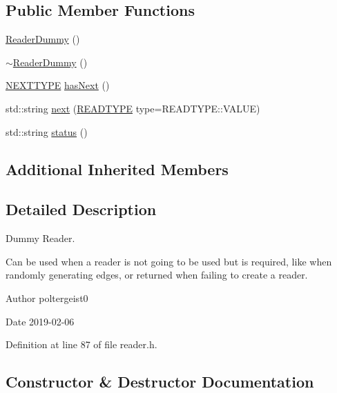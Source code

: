 \subsection*{Public Member Functions}
\begin{DoxyCompactItemize}
\item 
\hyperlink{classReaderDummy_afdafad1ede54a08c1e760b9d3b66a4ba}{Reader\+Dummy} ()
\item 
\hyperlink{classReaderDummy_aa35fb0b96855f0c195a9bd1dee074112}{$\sim$\+Reader\+Dummy} ()
\item 
\hyperlink{classReaderInterface_ac2420ec8d2f60feadf2533d4fa77ec5e}{N\+E\+X\+T\+T\+Y\+PE} \hyperlink{classReaderDummy_aac648da900b0602ea67b84521de5114c}{has\+Next} ()
\item 
std\+::string \hyperlink{classReaderDummy_a235a5bf7df9cf1e4b984c7a350cb055e}{next} (\hyperlink{classReaderInterface_a1e3610c289ae058a246de41154d8a266}{R\+E\+A\+D\+T\+Y\+PE} type=R\+E\+A\+D\+T\+Y\+P\+E\+::\+V\+A\+L\+UE)
\item 
std\+::string \hyperlink{classReaderDummy_a7d7fc03e8d3427c6c63262f2ff53ec84}{status} ()
\end{DoxyCompactItemize}
\subsection*{Additional Inherited Members}


\subsection{Detailed Description}
Dummy Reader. 

Can be used when a reader is not going to be used but is required, like when randomly generating edges, or returned when failing to create a reader.

\begin{DoxyAuthor}{Author}
poltergeist0
\end{DoxyAuthor}
\begin{DoxyDate}{Date}
2019-\/02-\/06 
\end{DoxyDate}


Definition at line 87 of file reader.\+h.



\subsection{Constructor \& Destructor Documentation}
\mbox{\label{classReaderDummy_afdafad1ede54a08c1e760b9d3b66a4ba}} 
